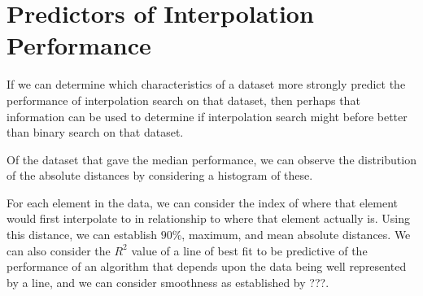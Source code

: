 \documentclass{article}
\begin{document}
\begin{figure}
\end{figure}

\section{Predictors of Interpolation Performance}
If we can determine which characteristics of a dataset more strongly predict the performance of interpolation search on that dataset, then perhaps that information can be used to determine if interpolation search might before better than binary search on that dataset.

Of the dataset that gave the median performance, we can observe the distribution of the absolute distances by considering a histogram of these.

\begin{figure}
\end{figure}


For each element in the data, we can consider the index of where that element would first interpolate to in relationship to where that element actually is. Using this distance, we can establish $90\%$, maximum, and mean absolute distances. We can also consider the $R^2$ value of a line of best fit to be predictive of the performance of an algorithm that depends upon the data being well represented by a line, and we can consider smoothness as established by ???.

\begin{figure}
\end{figure}
\end{document}
